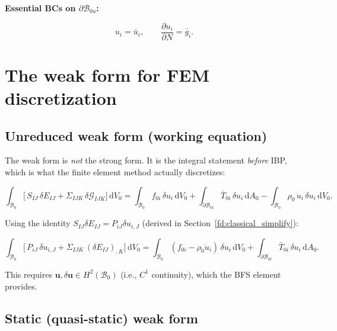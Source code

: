 \documentclass[11pt]{article}
\newcommand{\bu}{\mathbf{u}}
\newcommand{\bu}{\mathbf{u}}
\begin{document}
\textbf{Essential BCs on $\partial\mathcal{B}_{0u}$:}

\begin{equation}
u_{i} = \bar{u}_{i},
\qquad
\frac{\partial u_{i}}{\partial N} = \bar{g}_{i}.
\end{equation}

\section{The weak form for FEM discretization}

\subsection{Unreduced weak form (working equation)}

The weak form is \emph{not} the strong form. It is the integral
statement \emph{before} IBP, which is what the finite element method
actually discretizes:

\begin{equation}
\boxed{
\int_{\mathcal{B}_{0}}
\bigl[\,S_{IJ}\,\delta E_{IJ}
      + \Sigma_{IJK}\,\delta\mathcal{G}_{IJK}\bigr]\,
\mathrm{d}V_{0}
= \int_{\mathcal{B}_{0}} f_{0i}\,\delta u_{i}\,\mathrm{d}V_{0}
+ \int_{\partial\mathcal{B}_{0t}} \bar{T}_{0i}\,\delta u_{i}\,
  \mathrm{d}A_{0}
- \int_{\mathcal{B}_{0}} \rho_{0}\,\ddot{u}_{i}\,\delta u_{i}\,
  \mathrm{d}V_{0}.
}
\end{equation}

Using the identity $S_{IJ}\delta E_{IJ}=P_{iJ}\delta u_{i,J}$
(derived in Section~\ref{fd:classical_simplify}):

\begin{equation}
\int_{\mathcal{B}_{0}}
\bigl[\,P_{iJ}\,\delta u_{i,J}
      + \Sigma_{IJK}\,(\delta E_{IJ})_{,K}\bigr]\,
\mathrm{d}V_{0}
= \int_{\mathcal{B}_{0}} (f_{0i}-\rho_{0}\ddot{u}_{i})\,
  \delta u_{i}\,\mathrm{d}V_{0}
+ \int_{\partial\mathcal{B}_{0t}} \bar{T}_{0i}\,\delta u_{i}\,
  \mathrm{d}A_{0}.
\end{equation}

This requires $\bu,\delta\bu\in H^{2}(\mathcal{B}_{0})$ (i.e.,
$C^{1}$ continuity), which the BFS element provides.

\subsection{Static (quasi-static) weak form}
\end{document}
